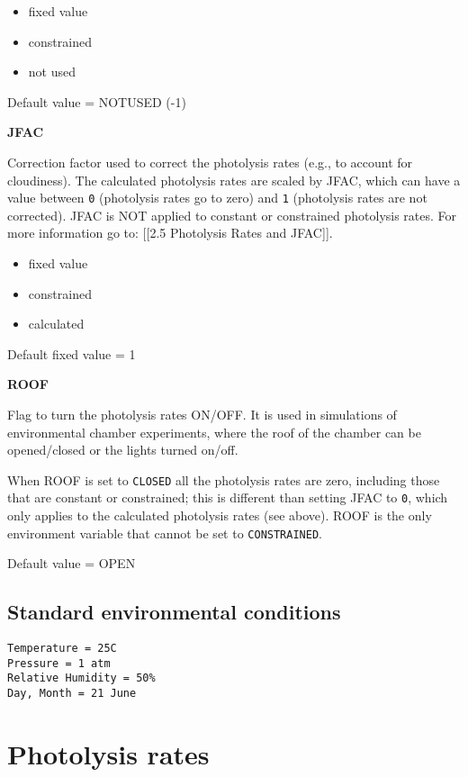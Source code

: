 \begin{itemize}
\item fixed value
\item constrained
\item not used
\end{itemize}

Default value = NOTUSED (-1)

\textbf{JFAC}

Correction factor used to correct the photolysis rates (e.g., to
account for cloudiness). The calculated photolysis rates are scaled by
JFAC, which can have a value between \texttt{0} (photolysis rates go
to zero) and \texttt{1} (photolysis rates are not corrected). JFAC is
NOT applied to constant or constrained photolysis rates. For more
information go to: {[}{[}2.5 Photolysis Rates and JFAC{]}{]}.

\begin{itemize}
\item fixed value
\item constrained
\item calculated
\end{itemize}

Default fixed value = 1

\textbf{ROOF}

Flag to turn the photolysis rates ON/OFF. It is used in simulations of
environmental chamber experiments, where the roof of the chamber can
be opened/closed or the lights turned on/off.

When ROOF is set to \texttt{CLOSED} all the photolysis rates are zero,
including those that are constant or constrained; this is different
than setting JFAC to \texttt{0}, which only applies to the calculated
photolysis rates (see above). ROOF is the only environment variable
that cannot be set to \texttt{CONSTRAINED}.

Default value = OPEN

\subsection{Standard environmental conditions} \label{subsec:standard-environmental-conditions}

\begin{verbatim}
Temperature = 25C
Pressure = 1 atm
Relative Humidity = 50%
Day, Month = 21 June
\end{verbatim}

\section{Photolysis rates} \label{sec:photolysis}

